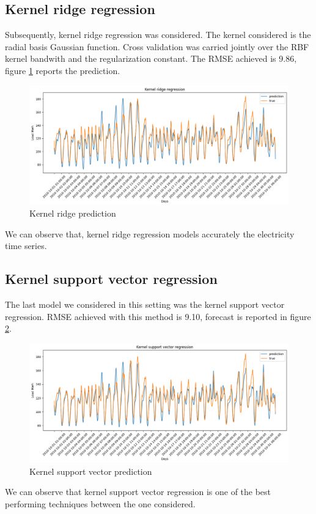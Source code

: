 \subsection{Kernel ridge regression}
Subsequently, kernel ridge regression was considered. The kernel considered is the radial basis Gaussian function.
Cross validation was carried jointly over the RBF kernel bandwith and the regularization constant.
The RMSE achieved is 9.86, figure \ref{fig:krnridge_price} reports the prediction.
\begin{figure}[!h]
    \includegraphics[width=\textwidth]{images/krnridge_price.png}
    \caption{Kernel ridge prediction}
    \label{fig:krnridge_price}
\end{figure}
We can observe that, kernel ridge regression models accurately the electricity time series.

\subsection{Kernel support vector regression}
The last model we considered in this setting was the kernel support vector regression.
RMSE achieved with this method is 9.10, forecast is reported in figure \ref{fig:krnsvr_price}.

\begin{figure}[!h]
    \includegraphics[width=\textwidth]{images/krnsvr_price.png}
    \caption{Kernel support vector prediction}
    \label{fig:krnsvr_price}
\end{figure}
We can observe that kernel support vector regression is one of the best performing techniques between the one considered.

